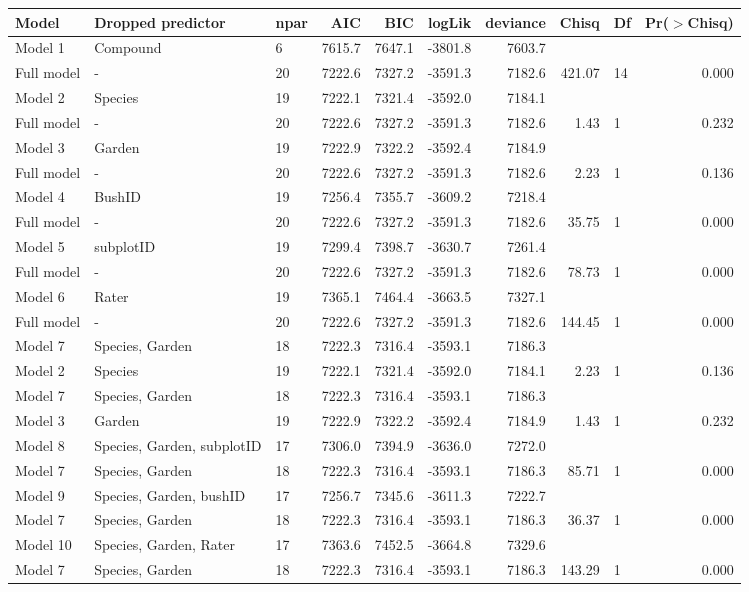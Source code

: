\begin{table}[ht]
\centering
\begin{tabular}{lllrrrrrlr}
  \hline
Model & Dropped predictor & npar & AIC & BIC & logLik & deviance & Chisq & Df & Pr($>$Chisq) \\ 
  \hline
Model 1 & Compound & 6 & 7615.7 & 7647.1 & -3801.8 & 7603.7 &  &  &  \\ 
  Full model & - & 20 & 7222.6 & 7327.2 & -3591.3 & 7182.6 & 421.07 & 14 & 0.000 \\ 
  Model 2 & Species & 19 & 7222.1 & 7321.4 & -3592.0 & 7184.1 &  &  &  \\ 
  Full model & - & 20 & 7222.6 & 7327.2 & -3591.3 & 7182.6 & 1.43 & 1 & 0.232 \\ 
  Model 3 & Garden & 19 & 7222.9 & 7322.2 & -3592.4 & 7184.9 &  &  &  \\ 
  Full model & - & 20 & 7222.6 & 7327.2 & -3591.3 & 7182.6 & 2.23 & 1 & 0.136 \\ 
  Model 4 & BushID & 19 & 7256.4 & 7355.7 & -3609.2 & 7218.4 &  &  &  \\ 
  Full model & - & 20 & 7222.6 & 7327.2 & -3591.3 & 7182.6 & 35.75 & 1 & 0.000 \\ 
  Model 5 & subplotID & 19 & 7299.4 & 7398.7 & -3630.7 & 7261.4 &  &  &  \\ 
  Full model & - & 20 & 7222.6 & 7327.2 & -3591.3 & 7182.6 & 78.73 & 1 & 0.000 \\ 
  Model 6 & Rater & 19 & 7365.1 & 7464.4 & -3663.5 & 7327.1 &  &  &  \\ 
  Full model & - & 20 & 7222.6 & 7327.2 & -3591.3 & 7182.6 & 144.45 & 1 & 0.000 \\ 
  Model 7 & Species, Garden & 18 & 7222.3 & 7316.4 & -3593.1 & 7186.3 &  &  &  \\ 
  Model 2 & Species & 19 & 7222.1 & 7321.4 & -3592.0 & 7184.1 & 2.23 & 1 & 0.136 \\ 
  Model 7 & Species, Garden & 18 & 7222.3 & 7316.4 & -3593.1 & 7186.3 &  &  &  \\ 
  Model 3 & Garden & 19 & 7222.9 & 7322.2 & -3592.4 & 7184.9 & 1.43 & 1 & 0.232 \\ 
  Model 8 & Species, Garden, subplotID & 17 & 7306.0 & 7394.9 & -3636.0 & 7272.0 &  &  &  \\ 
  Model 7 & Species, Garden & 18 & 7222.3 & 7316.4 & -3593.1 & 7186.3 & 85.71 & 1 & 0.000 \\ 
  Model 9 & Species, Garden, bushID & 17 & 7256.7 & 7345.6 & -3611.3 & 7222.7 &  &  &  \\ 
  Model 7 & Species, Garden & 18 & 7222.3 & 7316.4 & -3593.1 & 7186.3 & 36.37 & 1 & 0.000 \\ 
  Model 10 & Species, Garden, Rater & 17 & 7363.6 & 7452.5 & -3664.8 & 7329.6 &  &  &  \\ 
  Model 7 & Species, Garden & 18 & 7222.3 & 7316.4 & -3593.1 & 7186.3 & 143.29 & 1 & 0.000 \\ 
   \hline
\end{tabular}
\end{table}

